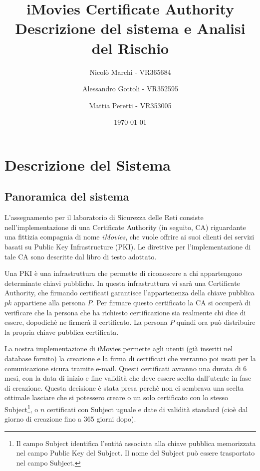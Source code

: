 \documentclass{article}
\title{\huge\sffamily\bfseries iMovies Certificate Authority {\huge\sffamily\bfseries Descrizione del sistema e Analisi del Rischio}}
\author{Nicolò Marchi - VR365684 \and Alessandro Gottoli - VR352595 \and Mattia Peretti - VR353005 }
\date{\today}
\begin{document}
\maketitle

\tableofcontents
\pagebreak
\listoffigures
\pagebreak


\section{Descrizione del Sistema}

\subsection{Panoramica del sistema}

L'assegnamento per il laboratorio di Sicurezza delle Reti consiste nell'implementazione di una Certificate Authority (in seguito, CA) riguardante una fittizia compagnia di nome \emph{iMovies}, che vuole offrire ai suoi clienti dei servizi basati su Public Key Infrastructure (PKI).
Le direttive per l'implementazione di tale CA sono descritte dal libro di testo \cite{applied security} adottato.

Una PKI è una infrastruttura che permette di riconoscere a chi appartengono determinate chiavi pubbliche. In questa infrastruttura vi sarà una Certificate Authority, che firmando certificati garantisce l'appartenenza della chiave pubblica $pk$ appartiene alla persona $P$.
Per firmare questo certificato la CA si occuperà di verificare che la persona che ha richiesto certificazione sia realmente chi dice di essere, dopodichè ne firmerà il certificato.
La persona $P$ quindi ora può distribuire la propria chiave pubblica certificata.

La nostra implementazione di iMovies permette agli utenti (già inseriti nel database fornito) la creazione e la firma di certificati che verranno poi usati per la comunicazione sicura tramite e-mail.
Questi certificati avranno una durata di 6 mesi, con la data di inizio e fine validità che deve essere scelta dall'utente in fase di creazione. Questa decisione è stata presa perchè non ci sembrava una scelta ottimale lasciare che si potessero creare o un solo certificato con lo stesso Subject\footnote{Il campo Subject identifica l'entità associata alla chiave pubblica memorizzata nel campo Public Key del Subject. Il nome del Subject può essere trasportato nel campo Subject.}, o $n$ certificati con Subject uguale e date di validità standard (cioè dal giorno di creazione fino a 365 giorni dopo).
\end{document}
